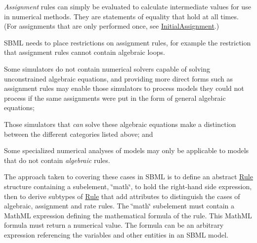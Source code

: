 \begin{DoxyItemize}
\item {\itshape Assignment} rules can simply be evaluated to calculate intermediate values for use in numerical methods. They are statements of equality that hold at all times. (For assignments that are only performed once, see \hyperlink{class_initial_assignment}{Initial\+Assignment}.)\end{DoxyItemize}
\begin{DoxyItemize}
\item S\+B\+ML needs to place restrictions on assignment rules, for example the restriction that assignment rules cannot contain algebraic loops.\end{DoxyItemize}
\begin{DoxyItemize}
\item Some simulators do not contain numerical solvers capable of solving unconstrained algebraic equations, and providing more direct forms such as assignment rules may enable those simulators to process models they could not process if the same assignments were put in the form of general algebraic equations;\end{DoxyItemize}
\begin{DoxyItemize}
\item Those simulators that {\itshape can} solve these algebraic equations make a distinction between the different categories listed above; and\end{DoxyItemize}
\begin{DoxyItemize}
\item Some specialized numerical analyses of models may only be applicable to models that do not contain {\itshape algebraic} rules.\end{DoxyItemize}
The approach taken to covering these cases in S\+B\+ML is to define an abstract \hyperlink{class_rule}{Rule} structure containing a subelement, \char`\"{}math\char`\"{}, to hold the right-\/hand side expression, then to derive subtypes of \hyperlink{class_rule}{Rule} that add attributes to distinguish the cases of algebraic, assignment and rate rules. The \char`\"{}math\char`\"{} subelement must contain a Math\+ML expression defining the mathematical formula of the rule. This Math\+ML formula must return a numerical value. The formula can be an arbitrary expression referencing the variables and other entities in an S\+B\+ML model.

